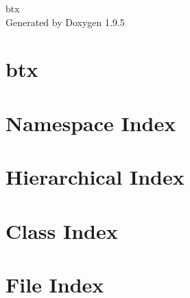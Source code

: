 \documentclass[twoside]{book}
\newcommand{\+}{\discretionary{\mbox{\scriptsize$\hookleftarrow$}}{}{}}
\newcommand{\clearemptydoublepage}{%
    \newpage{\pagestyle{empty}\cleardoublepage}%
  }
\begin{document}
  \raggedbottom
    \hypersetup{pageanchor=false,
                bookmarksnumbered=true,
                pdfencoding=unicode
               }
  \begin{titlepage}
  \vspace*{7cm}
  \begin{center}%
  {\Large btx}\\
  \vspace*{1cm}
  {\large Generated by Doxygen 1.9.5}\\
  \end{center}
  \end{titlepage}
  \clearemptydoublepage
  \tableofcontents
  \clearemptydoublepage
  \hypersetup{pageanchor=true}
\chapter{btx}
\label{md_README}

\chapter{Namespace Index}

\chapter{Hierarchical Index}

\chapter{Class Index}

\chapter{File Index}

\end{document}
